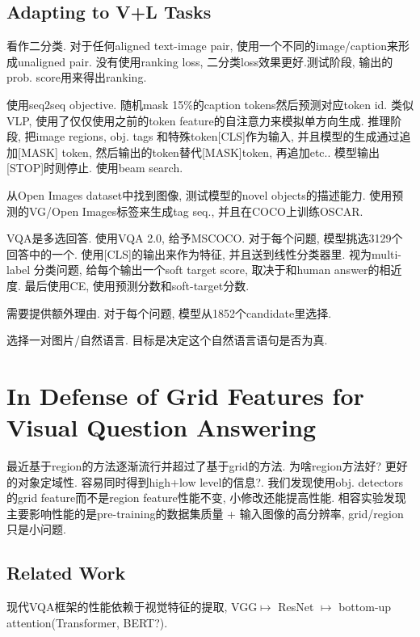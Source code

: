 \documentclass{article}
\begin{document}
\subsection{Adapting to V+L Tasks}

看作二分类. 对于任何aligned text-image pair, 使用一个不同的image/caption来形成unaligned pair. 没有使用ranking loss, 二分类loss效果更好.测试阶段, 输出的prob. score用来得出ranking.

使用seq2seq objective. 随机mask 15\%的caption tokens然后预测对应token id. 类似VLP, 使用了仅仅使用之前的token feature的自注意力来模拟单方向生成. 推理阶段, 把image regions, obj. tags 和特殊token[CLS]作为输入, 并且模型的生成通过追加[MASK] token, 然后输出的token替代[MASK]token, 再追加etc.. 模型输出[STOP]时则停止. 使用beam search.

从Open Images dataset中找到图像, 测试模型的novel objects的描述能力. 使用预测的VG/Open Images标签来生成tag seq., 并且在COCO上训练OSCAR.

VQA是多选回答. 使用VQA 2.0, 给予MSCOCO. 对于每个问题, 模型挑选3129个回答中的一个. 使用[CLS]的输出来作为特征, 并且送到线性分类器里. 视为multi-label 分类问题, 给每个输出一个soft target score, 取决于和human answer的相近度. 最后使用CE, 使用预测分数和soft-target分数.

需要提供额外理由. 对于每个问题, 模型从1852个candidate里选择.

选择一对图片/自然语言. 目标是决定这个自然语言语句是否为真.


\section{In Defense of Grid Features for Visual Question Answering}

最近基于region的方法逐渐流行并超过了基于grid的方法. 
为啥region方法好? 更好的对象定域性. 容易同时得到high+low level的信息?. 我们发现使用obj. detectors的grid feature而不是region feature性能不变, 小修改还能提高性能. 相容实验发现主要影响性能的是pre-training的数据集质量 + 输入图像的高分辨率, grid/region只是小问题.

\subsection{Related Work}

现代VQA框架的性能依赖于视觉特征的提取, VGG$\mapsto$ ResNet $\mapsto$ bottom-up attention(Transformer, BERT?).
\end{document}
